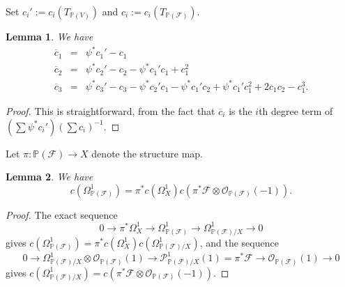 \documentclass[reqno]{amsart}
\newtheorem{lemma}{Lemma}[section]
\theoremstyle{definition}
\theoremstyle{remark}
\begin{document}
Set $c_i':=c_i(T_{\mathbb P(V)})$ and $c_i:=c_i(T_{\mathbb P(\mathcal F)})$. 

\begin{lemma}\label{chern}
We have
\begin{eqnarray*}
\overline c_1   &=&  \psi^*c_1'-c_1\\
\overline c_2 &=&  \psi^*c_2'-c_2-\psi^*c_1'c_1+c_1^2\\
\overline c_3  &=&  \psi^*c_3'-c_3-\psi^*c_2'c_1-\psi^*c_1'c_2+\psi^*c_1'c_1^2+2c_1c_2-c_1^3.
\end{eqnarray*}
\end{lemma}

\begin{proof}
This is straightforward, from the fact that $\overline c_i$ is the $i$th degree term of $(\sum \psi^*c_i')(\sum c_i)^{-1}$.
\end{proof}

Let $\pi\colon \mathbb P(\mathcal F) \to X$ denote the structure map.

\begin{lemma}\label{cF}
We have
\[ c(\Omega_{\mathbb P(\mathcal F)}^1)=\pi^*c(\Omega^1_X)c(\pi^*\mathcal F \otimes \mathcal O_{\mathbb P(\mathcal F)}(-1)).
\]
\end{lemma}

\begin{proof}
The exact sequence
\[ 0\to \pi^* \Omega_X^1 \to \Omega_{\mathbb P(\mathcal F)}^1 \to \Omega^1_{\mathbb P(\mathcal F)/X} \to 0
\]
gives $c(\Omega_{\mathbb P(\mathcal F)}^1)=\pi^*c(\Omega^1_X)c(\Omega_{\mathbb P(\mathcal F)/X}^1)$,
and the sequence
\[ 0 \to \Omega_{\mathbb P(\mathcal F)/X}^1 \otimes \mathcal O_{\mathbb P(\mathcal F)}(1) \to \mathcal P^1_{\mathbb P(\mathcal F)/X}(1)=\pi^*\mathcal F \to  \mathcal O_{\mathbb P(\mathcal F)}(1) \to 0
\]
gives $c(\Omega_{\mathbb P(\mathcal F)/X}^1)=c(\pi^*\mathcal F \otimes \mathcal O_{\mathbb P(\mathcal F)}(-1))$.
\end{proof}
\end{document}
